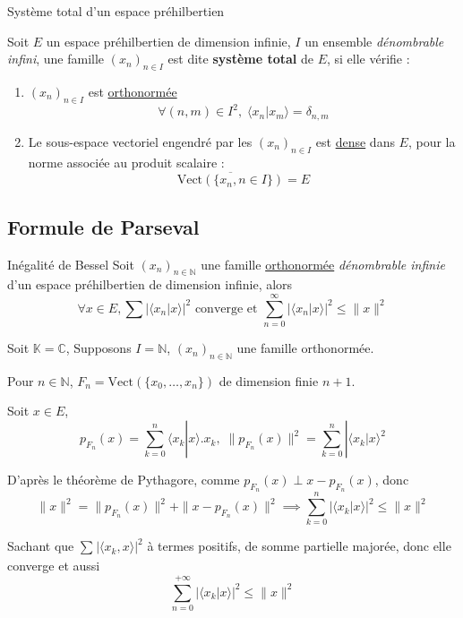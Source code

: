\begin{Definition}[colbacktitle=red!75!black]{Système total d'un espace préhilbertien}{}

  Soit $E$ un espace préhilbertien de dimension infinie, $I$ un ensemble \textit{dénombrable infini}, une famille $(x_n) _{n \in I}$ est dite \textbf{système total} de $E$, si elle vérifie :
  \begin{enumerate}

      \item $(x_n) _{n \in I}$ est \underline{orthonormée} 
        \[
          \forall (n, m) \in I ^{2}, \; \langle x_n | x_m \rangle= \delta _{n,m}
        \]
      \item Le sous-espace vectoriel engendré par les $(x_n) _{n \in I}$ est \underline{dense} dans $E$, pour la norme associée au produit scalaire : 
        \[
          \overline{\mathrm{Vect}(\{x_n, n\in I\})} = E
        \]

  \end{enumerate}
\end{Definition}

\subsection{Formule de Parseval}
\begin{Theorem}{Inégalité de Bessel}{}
Soit $(x_n) _{n \in \mathbb{N}}$ une famille \underline{orthonormée} \textit{dénombrable infinie} d'un espace préhilbertien de dimension infinie, alors 
\[
  \forall x\in E, \sum_{}^{} \left| \langle x_n | x \rangle \right| ^{2} \text{ converge et } \sum_{n=0}^{\infty} | \langle x_n | x \rangle | ^{2} \le \| x \| ^{2}
\]
\end{Theorem}

\begin{myproof}{}{}
Soit $\mathbb{K} = \mathbb{C}$, Supposons $I = \mathbb{N}$, $(x_n) _{n \in \mathbb{N}}$ une famille orthonormée.

Pour $n \in \mathbb{N}$, $F_n= \mathrm{Vect} \left( \{x_0, \dots, x_n\} \right)$ de dimension finie $n+1$.

Soit $x \in E$, 
\[
  p _{F_n}(x) = \sum_{k=0}^{n} \langle x_k | x \rangle. x_k, \;\| p _{F_n }(x) \| ^{2 } = \sum_{k=0 }^{n } | \langle x_k | x  \rangle ^{2}
\]

D'après le théorème de Pythagore, comme $p _{F_n}(x) \perp x - p _{F_n }(x)$, donc 
\[
  \| x \| ^{2 } = \| p _{F_n}(x) \| ^{2 } + \| x - p _{F_n}(x)  \| ^{2 } \implies \sum_{k=0 }^{ n } | \langle x_k | x \rangle| ^{2 } \le \| x \| ^{2}
\]

Sachant que $\sum_{}^{} | \langle x_k ,x  \rangle| ^{2}$ à termes positifs, de somme partielle majorée, donc elle converge et aussi 
\[
  \sum_{n=0 }^{+ \infty} | \langle x_k | x \rangle| ^{2 } \le \| x \| ^{2}
\]
\end{myproof}

